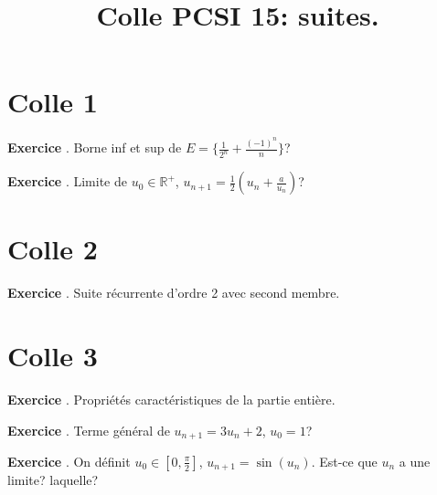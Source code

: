 \documentclass[10pt,a4paper]{article}
\title{Colle PCSI 15: suites.}
\newcounter{question}
\newcounter{exo}
\newenvironment{exo}{\vspace{0.5cm}\setcounter{question}{0}\addtocounter{exo}{1} \noindent \textbf{Exercice \theexo}. \normalsize }{\par}
\begin{document}
	\maketitle
	
	
	\section*{Colle 1}
	\setcounter{exo}{0}

	\begin{exo}
		Borne inf et sup de $E = \lbrace \frac{1}{2^n} + \frac{(-1)^n}{n} \rbrace$?
	\end{exo}

	\begin{exo}
		Limite de $u_0 \in \mathbb{R}^+$, $u_{n+1} = \frac{1}{2} (u_n +\frac{a}{u_n})$?
	\end{exo}
	
	\section*{Colle 2}
	\setcounter{exo}{0}
	
	\begin{exo}
		Suite récurrente d'ordre 2 avec second membre.
	\end{exo}		
	
	\section*{Colle 3}
	\setcounter{exo}{0}
		
	\begin{exo}
		Propriétés caractéristiques de la partie entière.
	\end{exo}
	
	\begin{exo}
		Terme général de $u_{n+1} = 3 u_n + 2$, $u_0 = 1$?
	\end{exo}	

	\begin{exo}
		On définit $u_0 \in [0, \frac{\pi}{2}]$, $u_{n+1} = \sin(u_n)$. Est-ce que $u_n$ a une limite? laquelle?
	\end{exo}	
	
\end{document}
